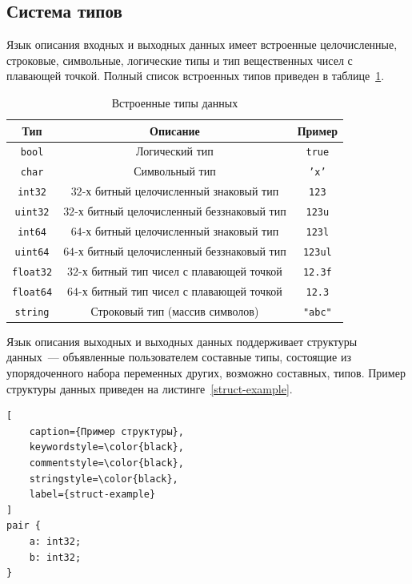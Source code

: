 \documentclass[times,specification,annotation]{style/itmo-student-thesis/itmo-student-thesis}
\begin{document}
\subsection{Система типов}

Язык описания входных и выходных данных имеет встроенные целочисленные, строковые, символьные, логические типы и тип вещественных чисел с плавающей точкой. Полный список встроенных типов приведен в таблице~\ref{predefined-types}.

\begin{table}[!h]
\caption{Встроенные типы данных}\label{predefined-types}
\centering
\begin{tabular}{|*{3}{c|}}\hline
Тип & Описание & Пример\\\hline
\texttt{bool} & Логический тип & \texttt{true} \\\hline
\texttt{char} & Символьный тип & \texttt{'x'}\\\hline
\texttt{int32} & $32$-х битный целочисленный знаковый тип & \texttt{123} \\\hline
\texttt{uint32} & $32$-х битный целочисленный беззнаковый тип & \texttt{123u} \\\hline
\texttt{int64} & $64$-х битный целочисленный знаковый тип & \texttt{123l} \\\hline
\texttt{uint64} & $64$-х битный целочисленный беззнаковый тип & \texttt{123ul} \\\hline
\texttt{float32} & $32$-х битный тип чисел с плавающей точкой & \texttt{12.3f} \\\hline
\texttt{float64} & $64$-х битный тип чисел с плавающей точкой & \texttt{12.3} \\\hline
\texttt{string} & Строковый тип (массив символов) & \texttt{"abc"} \\\hline
\end{tabular}
\end{table}

Язык описания выходных и выходных данных поддерживает структуры данных~--- объявленные пользователем составные типы, состоящие из упорядоченного набора переменных других, возможно составных, типов. Пример структуры данных приведен на листинге~\ref{struct-example}.

\begin{lstlisting}[
    caption={Пример структуры},
    keywordstyle=\color{black},
    commentstyle=\color{black},
    stringstyle=\color{black},
    label={struct-example}
]
pair {
    a: int32;
    b: int32;
}
\end{lstlisting}
\end{document}
